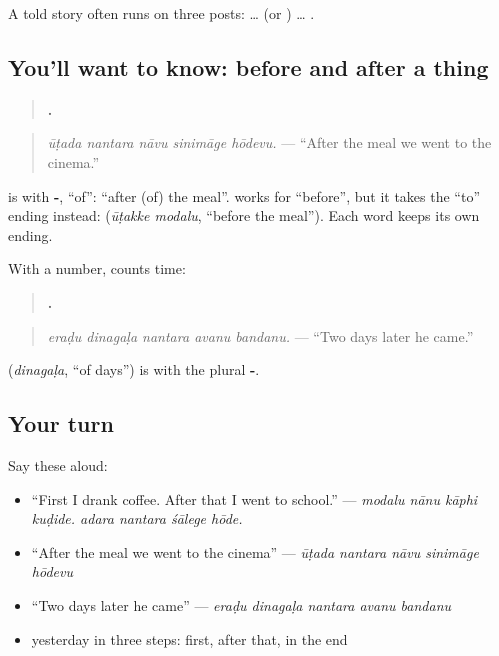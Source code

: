 A told story often runs on three posts: \textbf{} … \textbf{ } (or \textbf{}) … \textbf{}.

\subsection*{You'll want to know: before and after a thing}
\begin{quote}
\textbf{    .}
\end{quote}

\begin{quote}
\emph{ūṭada nantara nāvu sinimāge hōdevu.} — \textquotedblleft{}After the meal we went to the cinema.\textquotedblright{}
\end{quote}

\textbf{} is \textbf{} with \textbf{-}, \textquotedblleft{}of\textquotedblright{}: \textquotedblleft{}after (of) the meal\textquotedblright{}. \textbf{} works for \textquotedblleft{}before\textquotedblright{}, but it takes the \textquotedblleft{}to\textquotedblright{} ending instead: \textbf{ } (\emph{ūṭakke modalu}, \textquotedblleft{}before the meal\textquotedblright{}). Each word keeps its own ending.

With a number, \textbf{} counts time:

\begin{quote}
\textbf{    .}
\end{quote}

\begin{quote}
\emph{eraḍu dinagaḷa nantara avanu bandanu.} — \textquotedblleft{}Two days later he came.\textquotedblright{}
\end{quote}

\textbf{} (\emph{dinagaḷa}, \textquotedblleft{}of days\textquotedblright{}) is \textbf{} with the plural \textbf{-}.

\subsection*{Your turn}
Say these aloud:

\begin{itemize}
\raggedright
  \item \textquotedblleft{}First I drank coffee. After that I went to school.\textquotedblright{} — \emph{modalu nānu kāphi kuḍide. adara nantara śālege hōde.}
  \item \textquotedblleft{}After the meal we went to the cinema\textquotedblright{} — \emph{ūṭada nantara nāvu sinimāge hōdevu}
  \item \textquotedblleft{}Two days later he came\textquotedblright{} — \emph{eraḍu dinagaḷa nantara avanu bandanu}
  \item yesterday in three steps: first, after that, in the end
\end{itemize}

